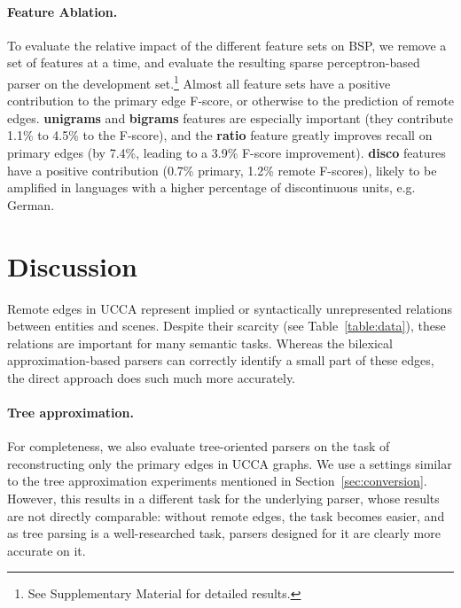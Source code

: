 \documentclass[11pt]{article}
\newcommand{\secref}[1]{Section~\ref{#1}}
\newcommand{\tabref}[1]{Table~\ref{#1}}
\begin{document}
\paragraph{Feature Ablation.}
To evaluate the relative impact of the different feature sets on BSP,
we remove a set of features at a time,
and evaluate the resulting sparse perceptron-based parser on the development set.\footnote{See
Supplementary Material for detailed results.}
Almost all feature sets have a positive contribution to the primary edge F-score, 
or otherwise to the prediction of remote edges.
\textbf{unigrams} and \textbf{bigrams} features are especially
important (they contribute 1.1\% to 4.5\% to the F-score),
and the \textbf{ratio} feature greatly improves recall on
primary edges (by 7.4\%, leading to  a 3.9\% F-score improvement).
\textbf{disco} features have a positive contribution
(0.7\% primary, 1.2\% remote F-scores),
likely to be amplified in languages with a higher percentage of discontinuous units, e.g. German.

\section{Discussion}

Remote edges in UCCA represent implied or syntactically unrepresented relations between entities
and scenes.
Despite their scarcity (see \tabref{table:data}), these relations are important for many semantic
tasks.
Whereas the bilexical approximation-based parsers can correctly identify a small part of these
edges, the direct approach does such much more accurately.

\paragraph{Tree approximation.}
For completeness, we also evaluate tree-oriented parsers on the task of reconstructing
only the primary edges in UCCA graphs.
We use a settings similar to the tree approximation experiments mentioned in \secref{sec:conversion}.
However, this results in a different task for the underlying parser, whose results are not directly
comparable:
without remote edges, the task becomes easier, and
as tree parsing is a well-researched task, parsers designed for it are clearly more accurate on it.
\end{document}
